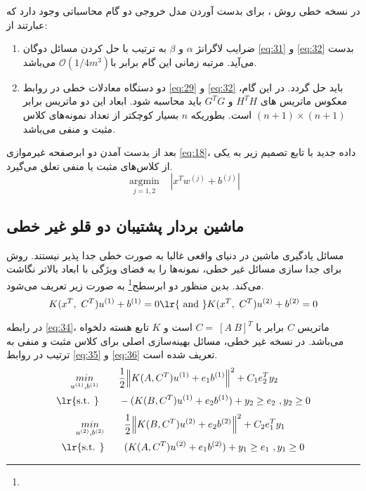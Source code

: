 در نسخه خطی روش ، برای بدست آوردن مدل خروجی دو گام محاسباتی وجود دارد که عبارتند از:
\begin{enumerate}
	\item ضرایب لاگرانژ $\alpha$  و $\beta$  به ترتیب با حل کردن مسائل دوگان \ref{eq:31} و \ref{eq:32} بدست می‌آید. مرتبه زمانی این گام برابر با$\mathcal{O}({1/4{m}^{3}})$  می‌باشد.
	\item	دو دستگاه معادلات خطی در روابط   \ref{eq:29} و \ref{eq:32} باید حل گردد. در این گام، معکوس ماتریس های  $H^{T}H$ و  $G^{T}G$ باید محاسبه شود. ابعاد این دو ماتریس برابر $(n + 1) \times (n + 1)$  است. بطوریکه   $n$ بسیار کوچکتر از تعداد نمونه‌های   کلاس مثبت و منفی می‌باشد.
\end{enumerate}

بعد از بدست آمدن دو ابرصفحه غیرموازی \ref{eq:18}، داده جدید با تابع تصمیم زیر به یکی از کلاس‌های مثبت یا منفی تعلق می‌گیرد.
\begin{equation}
\underset{j=1,2}{\mathop{arg\min }}\,\text{ } \left| {{x}^{T}}{{w}^{(j)}}+{{b}^{(j)}} \right|
\label{eq:33}
\end{equation}

\subsection{ماشین بردار پشتیبان دو قلو غیر خطی}\label{sec:2:2:2}
مسائل یادگیری ماشین در دنیای واقعی غالبا به صورت خطی جدا پذیر نیستند. روش  برای جدا سازی مسائل غیر خطی، نمونه‌ها را به فضای ویژگی با ابعاد بالاتر نگاشت می‌کند. بدین منظور دو ابرسطح\footnote{}  به صورت زیر تعریف می‌شود.
\begin{equation}
K({{x}^{T}},~{{C}^{T}}){{u}^{\left( 1 \right)}}+{{b}^{\left( 1 \right)}}=0 \text{\lr{ and }} K({{x}^{T}},~{{C}^{T}}){{u}^{\left( 2 \right)}}+{{b}^{\left( 2 \right)}}=0
\label{eq:34}
\end{equation}

در رابطه \ref{eq:34}، ماتریس $C$ برابر با  $C=~\left[ A \  B \right]^{T}$ است و $K$ تابع هسته دلخواه می‌باشد. در نسخه غیر خطی، مسائل بهینه‌سازی اصلی برای کلاس مثبت و منفی به ترتیب در روابط \ref{eq:35} و \ref{eq:36} تعریف شده است. 
\begin{equation}
\begin{split}
\mathop{{ min}}\limits_{u^{(1)} ,b^{(1)}} \qquad & \frac{1}{2}{{\left\| K(A, C^{T}){{u}^{(1)}}+{{e}_{1}}{{b}^{(1)}} \right\|}^{2}}+{{C}_{1}}e_{2}^{T}y_{2} \\
\textrm{\lr{s.t. }} \qquad & -(K(B, C^{T}){{u}^{(1)}}+{{e}_{2}}{{b}^{(1)}})+ y_{2} \ge {{e}_{2}}\text{ },y_{2}\ge 0
\end{split}
\label{eq:35}
\end{equation}
\begin{equation}
\begin{split}
\mathop{{ min}}\limits_{u^{(2)} ,b^{(2)}} \qquad & \frac{1}{2}{{\left\| K(B, C^{T}){{u}^{(2)}}+{{e}_{2}}{{b}^{(2)}} \right\|}^{2}}+{{C}_{2}}e_{1}^{T}y_{1} \\
\textrm{\lr{s.t. }} \qquad & (K(A, C^{T}){{u}^{(2)}}+{{e}_{1}}{{b}^{(2)}})+ y_{1} \ge {{e}_{1}}\text{ },y_{1}\ge 0
\end{split}
\label{eq:36}
\end{equation}

